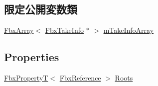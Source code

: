 \subsection*{限定公開変数類}
\begin{DoxyCompactItemize}
\item 
\hyperlink{class_fbx_array}{Fbx\+Array}$<$ \hyperlink{class_fbx_take_info}{Fbx\+Take\+Info} $\ast$ $>$ \hyperlink{class_fbx_document_a810679765dee13dd45040367eb59b131}{m\+Take\+Info\+Array}
\end{DoxyCompactItemize}
\subsection*{Properties}
\begin{DoxyCompactItemize}
\item 
\hyperlink{class_fbx_property_t}{Fbx\+PropertyT}$<$ \hyperlink{fbxtypes_8h_a44df6a2eec915cf27cd481e5c5e48a24}{Fbx\+Reference} $>$ \hyperlink{class_fbx_document_a268f701bbd245e43e661bc9a69f87646}{Roots}
\end{DoxyCompactItemize}
